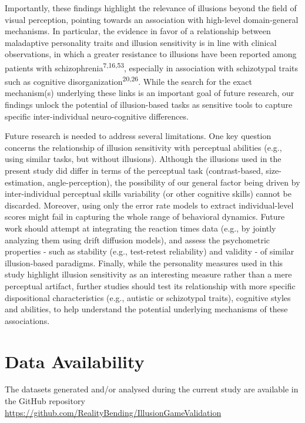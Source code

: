 \documentclass[
  man,floatsintext]{apa6}
\begin{document}
Importantly, these findings highlight the relevance of illusions beyond the field of visual perception, pointing towards an association with high-level domain-general mechanisms. In particular, the evidence in favor of a relationship between maladaptive personality traits and illusion sensitivity is in line with clinical observations, in which a greater resistance to illusions have been reported among patients with schizophrenia\textsuperscript{7,16,53}, especially in association with schizotypal traits such as cognitive disorganization\textsuperscript{20,26}. While the search for the exact mechanism(s) underlying these links is an important goal of future research, our findings unlock the potential of illusion-based tasks as sensitive tools to capture specific inter-individual neuro-cognitive differences.

Future research is needed to address several limitations. One key question concerns the relationship of illusion sensitivity with perceptual abilities (e.g., using similar tasks, but without illusions). Although the illusions used in the present study did differ in terms of the perceptual task (contrast-based, size-estimation, angle-perception), the possibility of our general factor being driven by inter-individual perceptual skills variability (or other cognitive skills) cannot be discarded. Moreover, using only the error rate models to extract individual-level scores might fail in capturing the whole range of behavioral dynamics. Future work should attempt at integrating the reaction times data (e.g., by jointly analyzing them using drift diffusion models), and assess the psychometric properties - such as stability (e.g., test-retest reliability) and validity - of similar illusion-based paradigms. Finally, while the personality measures used in this study highlight illusion sensitivity as an interesting measure rather than a mere perceptual artifact, further studies should test its relationship with more specific dispositional characteristics (e.g., autistic or schizotypal traits), cognitive styles and abilities, to help understand the potential underlying mechanisms of these associations.

\hypertarget{data-availability}{%
\section{Data Availability}\label{data-availability}}

The datasets generated and/or analysed during the current study are available in the GitHub repository \url{https://github.com/RealityBending/IllusionGameValidation}
\end{document}
